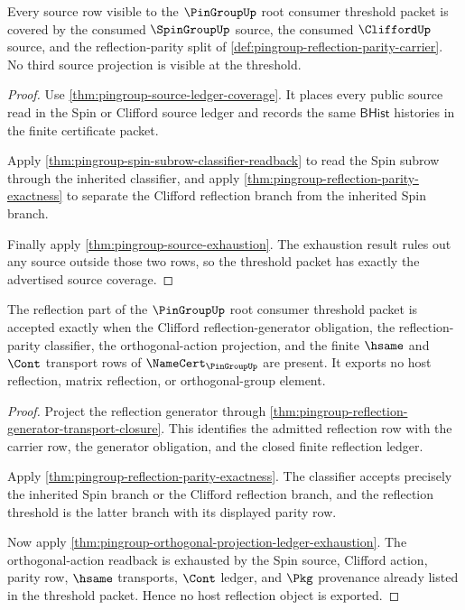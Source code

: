 \begin{theorem}
\label{thm:pingroup-root-source-threshold-coverage}
Every source row visible to the $\PinGroupUp$ root consumer threshold packet is
covered by the consumed $\SpinGroupUp$ source, the consumed $\CliffordUp$
source, and the reflection-parity split of
\autoref{def:pingroup-reflection-parity-carrier}. No third source projection is
visible at the threshold.
\end{theorem}
\begin{proof}
Use \autoref{thm:pingroup-source-ledger-coverage}. It places every public
source read in the Spin or Clifford source ledger and records the same
$\mathsf{BHist}$ histories in the finite certificate packet.

Apply \autoref{thm:pingroup-spin-subrow-classifier-readback} to read the Spin
subrow through the inherited classifier, and apply
\autoref{thm:pingroup-reflection-parity-exactness} to separate the Clifford
reflection branch from the inherited Spin branch.

Finally apply \autoref{thm:pingroup-source-exhaustion}. The exhaustion result
rules out any source outside those two rows, so the threshold packet has
exactly the advertised source coverage.
\end{proof}

\begin{theorem}
\label{thm:pingroup-root-reflection-threshold-exactness}
The reflection part of the $\PinGroupUp$ root consumer threshold packet is
accepted exactly when the Clifford reflection-generator obligation, the
reflection-parity classifier, the orthogonal-action projection, and the finite
$\hsame$ and $\Cont$ transport rows of $\NameCert_{\PinGroupUp}$ are present.
It exports no host reflection, matrix reflection, or orthogonal-group element.
\end{theorem}
\begin{proof}
Project the reflection generator through
\autoref{thm:pingroup-reflection-generator-transport-closure}. This identifies
the admitted reflection row with the carrier row, the generator obligation,
and the closed finite reflection ledger.

Apply \autoref{thm:pingroup-reflection-parity-exactness}. The classifier
accepts precisely the inherited Spin branch or the Clifford reflection branch,
and the reflection threshold is the latter branch with its displayed parity
row.

Now apply \autoref{thm:pingroup-orthogonal-projection-ledger-exhaustion}. The
orthogonal-action readback is exhausted by the Spin source, Clifford action,
parity row, $\hsame$ transports, $\Cont$ ledger, and $\Pkg$ provenance already
listed in the threshold packet. Hence no host reflection object is exported.
\end{proof}

